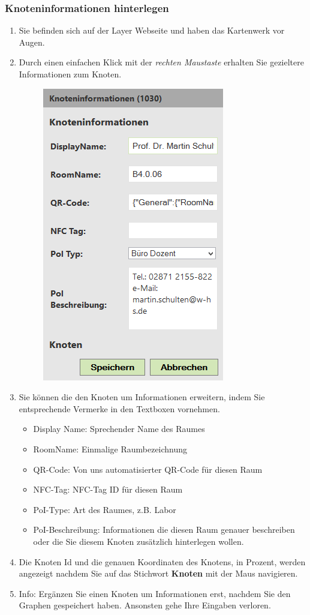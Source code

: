 \subsubsection*{Knoteninformationen hinterlegen}
\label{Knoteninformationen hinterlegen}
\begin{enumerate}
\item Sie befinden sich auf der Layer Webseite und haben das Kartenwerk vor Augen.
\item Durch einen einfachen Klick mit der \textit{rechten Maustaste} erhalten Sie gezieltere Informationen zum Knoten.
		\begin{figure}[H]
		\centering
		\includegraphics[width=0.3\linewidth]{../Bilder/Admin/AnleitungKnoteninformationen1}
		\label{fig:AnleitungKnoteninformationen1}
		\end{figure}
\item Sie können die den Knoten um Informationen erweitern, indem Sie entsprechende Vermerke in den Textboxen vornehmen.
	\begin{itemize}
	\item Display Name: Sprechender Name des Raumes
	\item RoomName: Einmalige Raumbezeichnung
	\item QR-Code: Von uns automatisierter QR-Code für diesen Raum
	\item NFC-Tag: NFC-Tag ID für diesen Raum
	\item PoI-Type: Art des Raumes, z.B. Labor
	\item PoI-Beschreibung: Informationen die diesen Raum genauer beschreiben oder die Sie diesem Knoten zusätzlich hinterlegen wollen.
	\end{itemize}
\item Die Knoten Id und die genauen Koordinaten des Knotens, in Prozent, werden angezeigt nachdem Sie auf das Stichwort \textbf{Knoten} mit der Maus navigieren.
\item Info: Ergänzen Sie einen Knoten um Informationen erst, nachdem Sie den Graphen gespeichert haben. Ansonsten gehe Ihre Eingaben verloren.
\end{enumerate}
